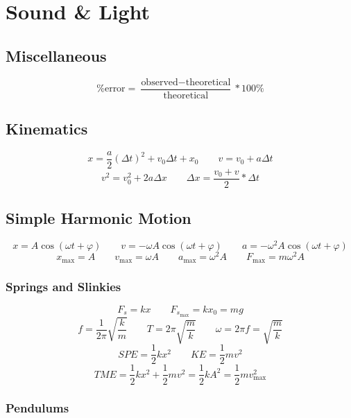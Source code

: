 
\chapter{Sound \& Light}

\newcommand\meter[0]{\text{m}}
\newcommand\watt[0]{\text{W}}
\newcommand\Joule[0]{\text{J}}
\newcommand\second[0]{\text{s}}
\newcommand\decibel[0]{\text{dB}}

\section{Miscellaneous}

\[
	\text{\% error} = \frac{\text{observed} - \text{theoretical}}{\text{theoretical}} * 100\%
\]

\section{Kinematics}

\[
	x = \frac{a}{2}(\Delta t)^2 + v_0\Delta t + x_0 \qquad
	v = v_0 + a\Delta t
\]\[
	v^2 = v_0^2 + 2a\Delta x \qquad
	\Delta x = \frac{v_0 + v}{2} * \Delta t
\]

\section{Simple Harmonic Motion}

\[
	x = A \cos(\omega t + \varphi) \qquad
	v = -\omega A \cos(\omega t + \varphi) \qquad
	a = -\omega^2 A \cos(\omega t + \varphi)
\]
\[
	x_{\max} = A \qquad
	v_{\max} = \omega A \qquad
	a_{\max} = \omega^2 A \qquad
	F_{\max} = m\omega^2 A
\]

\subsection{Springs and Slinkies}

\[
	F_s = kx \qquad
	F_{s_{\max}} = kx_0 = mg
\]
\[
	f = \frac{1}{2\pi}\sqrt{\frac{k}{m}} \qquad 
	T = 2\pi\sqrt{\frac{m}{k}} \qquad 
	\omega = 2\pi f = \sqrt{\frac{m}{k}}
\]
\[
	SPE = \frac{1}{2} kx^2 \qquad
	KE = \frac{1}{2} mv^2
\]
\[
	TME = \frac{1}{2} kx^2 + \frac{1}{2} mv^2 = \frac{1}{2} kA^2 = \frac{1}{2} mv_{\max}^2
\]

\subsection{Pendulums}

